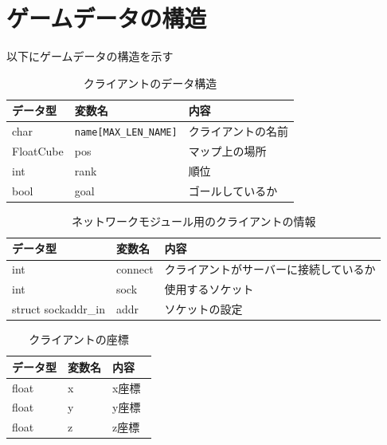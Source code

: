 \documentclass{jarticle}
\begin{document}
\section{ゲームデータの構造}
以下にゲームデータの構造を示す
\begin{table}[h]
    \caption{クライアントのデータ構造}
    \label{table:data1}
    \begin{center}
    \begin{tabular}{|l||l|l|}\hline
    データ型 & 変数名 & 内容　\\ \hline
    char & \verb+name[MAX_LEN_NAME]+ & クライアントの名前 \\ \hline
    FloatCube & pos & マップ上の場所 \\ \hline
    int & rank & 順位 \\ \hline
    bool & goal & ゴールしているか \\ \hline
    \end{tabular}
    \end{center}
\end{table}
\begin{table}[h]
    \caption{ネットワークモジュール用のクライアントの情報}
    \label{table:data2}
    \begin{center}
    \begin{tabular}{|l||l|l|}\hline
    データ型 & 変数名 & 内容　\\ \hline
    int & connect & クライアントがサーバーに接続しているか \\ \hline
    int & sock & 使用するソケット \\ \hline
    struct sockaddr\_in & addr & ソケットの設定 \\ \hline
    \end{tabular}
    \end{center}
\end{table}
\begin{table}[h]
    \caption{クライアントの座標}
    \label{table:data3}
    \begin{center}
    \begin{tabular}{|l||l|l|}\hline
    データ型 & 変数名 & 内容　\\ \hline
    float & x & x座標 \\ \hline
    float & y & y座標 \\ \hline
    float & z & z座標 \\ \hline
    \end{tabular}
    \end{center}
\end{table}
\end{document}
